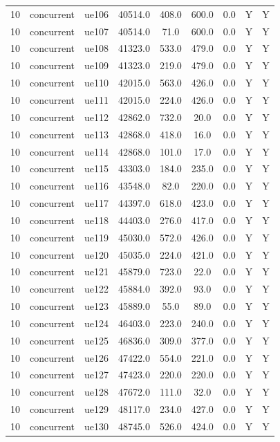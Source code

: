 \begin{table}[ht]
\begin{tabular}{|c|c|c|c|c|c|c|c|c|}
10 & concurrent & ue106 & 40514.0 & 408.0 & 600.0 & 0.0 & Y & Y \\
10 & concurrent & ue107 & 40514.0 & 71.0 & 600.0 & 0.0 & Y & Y \\
10 & concurrent & ue108 & 41323.0 & 533.0 & 479.0 & 0.0 & Y & Y \\
10 & concurrent & ue109 & 41323.0 & 219.0 & 479.0 & 0.0 & Y & Y \\
10 & concurrent & ue110 & 42015.0 & 563.0 & 426.0 & 0.0 & Y & Y \\
10 & concurrent & ue111 & 42015.0 & 224.0 & 426.0 & 0.0 & Y & Y \\
10 & concurrent & ue112 & 42862.0 & 732.0 & 20.0 & 0.0 & Y & Y \\
10 & concurrent & ue113 & 42868.0 & 418.0 & 16.0 & 0.0 & Y & Y \\
10 & concurrent & ue114 & 42868.0 & 101.0 & 17.0 & 0.0 & Y & Y \\
10 & concurrent & ue115 & 43303.0 & 184.0 & 235.0 & 0.0 & Y & Y \\
10 & concurrent & ue116 & 43548.0 & 82.0 & 220.0 & 0.0 & Y & Y \\
10 & concurrent & ue117 & 44397.0 & 618.0 & 423.0 & 0.0 & Y & Y \\
10 & concurrent & ue118 & 44403.0 & 276.0 & 417.0 & 0.0 & Y & Y \\
10 & concurrent & ue119 & 45030.0 & 572.0 & 426.0 & 0.0 & Y & Y \\
10 & concurrent & ue120 & 45035.0 & 224.0 & 421.0 & 0.0 & Y & Y \\
10 & concurrent & ue121 & 45879.0 & 723.0 & 22.0 & 0.0 & Y & Y \\
10 & concurrent & ue122 & 45884.0 & 392.0 & 93.0 & 0.0 & Y & Y \\
10 & concurrent & ue123 & 45889.0 & 55.0 & 89.0 & 0.0 & Y & Y \\
10 & concurrent & ue124 & 46403.0 & 223.0 & 240.0 & 0.0 & Y & Y \\
10 & concurrent & ue125 & 46836.0 & 309.0 & 377.0 & 0.0 & Y & Y \\
10 & concurrent & ue126 & 47422.0 & 554.0 & 221.0 & 0.0 & Y & Y \\
10 & concurrent & ue127 & 47423.0 & 220.0 & 220.0 & 0.0 & Y & Y \\
10 & concurrent & ue128 & 47672.0 & 111.0 & 32.0 & 0.0 & Y & Y \\
10 & concurrent & ue129 & 48117.0 & 234.0 & 427.0 & 0.0 & Y & Y \\
10 & concurrent & ue130 & 48745.0 & 526.0 & 424.0 & 0.0 & Y & Y \\

\end{tabular}
\end{table}
